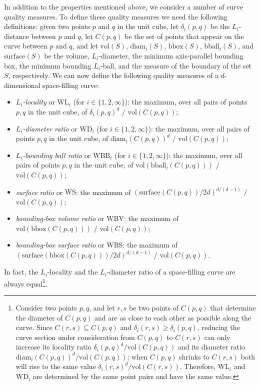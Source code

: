 \documentclass[11pt,a4paper]{article}
\def\WS{\ensuremath{\mathrm{WS}}\xspace}
\def\WBV{\ensuremath{\mathrm{WBV}}\xspace}
\def\WBS{\ensuremath{\mathrm{WBS}}\xspace}
\def\bbox{\ensuremath{\mathrm{bbox}}\xspace}
\begin{document}
In addition to the properties mentioned above, we consider a number of curve quality measures. To define these quality measures we need the following definitions: given two points $p$ and $q$ in the unit cube, let $\delta_i(p,q)$ be the $L_i$-distance between $p$ and $q$, let $C(p,q)$ be the set of points that appear on the curve between $p$ and $q$, and let $\mathrm{vol}(S)$, $\mathrm{diam}_i(S)$, $\bbox(S)$, $\mathrm{bball}_i(S)$, and $\mathrm{surface}(S)$ be the volume, $L_i$-diameter, the minimum axis-parallel bounding box, the minimum bounding $L_i$-ball, and the measure of the boundary of the set $S$, respectively. We can now define the following quality measures of a $d$-dimensional space-filling curve:\begin{itemize}
\item \emph{$L_i$-locality} or $\mathrm{WL}_i$ (for $i \in \{1,2,\infty\}$): the maximum, over all pairs of points $p,q$ in the unit cube, of $\delta_i(p,q)^d$ $/$ $\mathrm{vol}(C(p,q))$;
\item \emph{$L_i$-diameter ratio} or $\mathrm{WD}_i$ (for $i \in \{1,2,\infty\}$): the maximum, over all pairs of points $p,q$ in the unit cube, of $\mathrm{diam}_i(C(p,q))^d$ $/$ $\mathrm{vol}(C(p,q))$;
\item \emph{$L_i$-bounding ball ratio} or $\mathrm{WBB}_i$ (for $i \in \{1,2,\infty\}$): the maximum, over all pairs of points $p,q$ in the unit cube, of $\mathrm{vol}(\mathrm{bball}_i(C(p,q)))$ $/$ $\mathrm{vol}(C(p,q))$;
\item \emph{surface ratio} or \WS: the maximum of $(\mathrm{surface}(C(p,q))/2d)^{d/(d-1)}$ $/$ $\mathrm{vol}(C(p,q))$;
\item \emph{bounding-box volume ratio} or \WBV: the maximum of $\mathrm{vol}(\mathrm{bbox}(C(p,q)))$ $/$ $\mathrm{vol}(C(p,q))$;
\item \emph{bounding-box surface ratio} or \WBS: the maximum of $(\mathrm{surface}(\mathrm{bbox}(C(p,q)))/2d)^{d/(d-1)}$ $/$ $\mathrm{vol}(C(p,q))$.
\end{itemize}
In fact, the $L_i$-locality and the $L_i$-diameter ratio of a space-filling curve are always equal\footnote
{Consider two points $p,q$, and let $r,s$ be two points of $C(p,q)$ that determine the diameter of $C(p,q)$ and are as close to each other as possible along the curve. Since $C(r,s) \subseteq C(p,q)$ and $\delta_i(r,s) \geq \delta_i(p,q)$, reducing the curve section under consideration from $C(p,q)$ to $C(r,s)$ can only increase its locality ratio $\delta_i(p,q)^d / \mathrm{vol}(C(p,q))$ and its diameter ratio $\mathrm{diam}_i(C(p,q))^d / \mathrm{vol}(C(p,q))$; when $C(p,q)$ shrinks to $C(r,s)$ both will rise to the same value $\delta_i(r,s)^d / \mathrm{vol}(C(r,s))$. Therefore, $\mathrm{WL}_i$ and $\mathrm{WD}_i$ are determined by the same point pairs and have the same value.}.
\end{document}
